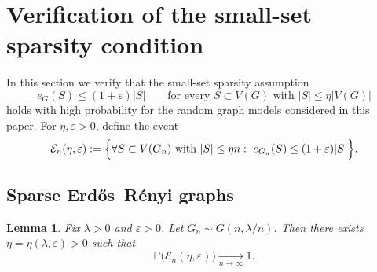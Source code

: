 \documentclass[11pt]{article}
\newtheorem{lemma}[theorem]{Lemma}
\theoremstyle{remark}
\theoremstyle{plain}
\newcommand{\Pbb}{\mathbb{P}}
\newcommand{\1}{\mathbbm{1}}
\begin{document}
\section{Verification of the small-set sparsity condition}

In this section we verify that the small-set sparsity assumption
\begin{equation}
e_G(S)\le (1+\varepsilon)|S|
\qquad
\text{for every }S\subset V(G)\text{ with }|S|\le \eta |V(G)|
\tag{A1}
\end{equation}
holds with high probability for the random graph models considered in this paper. For \(\eta,\varepsilon>0\), define the event
\[
\mathcal E_n(\eta,\varepsilon)
:=
\Bigl\{
\forall S\subset V(G_n)\text{ with }|S|\le \eta n:\ 
e_{G_n}(S)\le (1+\varepsilon)|S|
\Bigr\}.
\]

\subsection{Sparse Erd\H{o}s--R\'enyi graphs}

\begin{lemma}
\label{lem:A1-ER}
Fix \(\lambda>0\) and \(\varepsilon>0\). Let \(G_n\sim G(n,\lambda/n)\). Then there exists \(\eta=\eta(\lambda,\varepsilon)>0\) such that
\[
\Pbb\bigl(\mathcal E_n(\eta,\varepsilon)\bigr)\xrightarrow[n\to\infty]{}1.
\]
\end{lemma}
\end{document}

